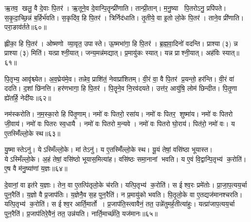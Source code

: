 ऋ॒तव॒ खलु॒ वै दे॒वाः पि॒तर॑।
ऋ॒तूने॒व दे॒वान्पि॒तॄन्प्री॑णाति।
तान्प्री॒तान्।
म॒नु॒ष्या पि॒तरोऽनु॒ प्रपि॑पते।
स॒कृ॒दा॒च्छि॒न्नं ब॒र्\mbox{}हिर्भ॑वति।
स॒कृदि॑व॒ हि पि॒तर॑।
त्रिर्निद॑धाति।
तृ॒तीये॒ वा इ॒तो लो॒के पि॒तर॑।
ताने॒व प्री॑णाति।
परा॒ङाव॑र्तते॥६०॥

ह्लीका॒ हि पि॒तर॑।
ओष्मणो व्या॒वृत॒ उपास्ते।
ऊ॒ष्मभा॑गा॒ हि पि॒तर॑।
ब्र॒ह्म॒वा॒दिनो॑ वदन्ति।
प्राश्या (३) न्न प्राश्या (३) मिति॑।
यत्प्राश्नी॒यात्।
जन्य॒मन्न॑मद्यात्।
प्र॒मायु॑कः स्यात्।
यन्न प्राश्नी॒यात्।
अह॑विः स्यात्॥६१॥

पि॒तृभ्य॒ आवृ॑श्च्येत।
अ॒व॒घ्रेय॑मे॒व।
तन्नेव॒ प्राशि॑तं॒ नेवाप्रा॑शितम्।
वी॒रं वा॒ वै पि॒तर॑ प्र॒यन्तो॒ हर॑न्ति।
वी॒रं वा॑ ददति।
द॒शां छि॑नत्ति।
हर॑णभागा॒ हि पि॒तर॑।
पि॒तॄने॒व नि॒रव॑दयते।
उत्त॑र॒ आयु॑षि॒ लोम॑ छिन्दीत।
पि॒तृ॒णा ह्ये॑तर्\mbox{}हि॒ नेदी॑यः॥६२॥

नम॑स्करोति।
न॒म॒स्का॒रो हि पि॑तृ॒णाम्।
नमो॑ वः पितरो॒ रसा॑य।
नमो॑ वः पितर॒ शुष्मा॑य।
नमो॑ वः पितरो जी॒वाय॑।
नमो॑ वः पितरः स्व॒धायै।
नमो॑ वः पितरो म॒न्यवे।
नमो॑ वः पितरो घो॒राय॑।
पित॑रो॒ नमो॑ वः।
य ए॒तस्मिँ॑ल्लो॒के स्थ॥६३॥

यु॒ष्मास्तेऽनु॑।
येऽस्मिँल्लो॒के।
मां तेऽनु॑।
य ए॒तस्मिँ॑ल्लो॒के स्थ।
यू॒यं तेषां॒ वसि॑ष्ठा भूयास्त।
येऽस्मिँल्लो॒के।
अ॒हं तेषां॒ वसि॑ष्ठो भूयास॒मित्या॑ह।
वसि॑ष्ठः समा॒नानां भवति।
य ए॒वं वि॒द्वान्पि॒तृभ्य॑ क॒रोति॑।
ए॒ष वै म॑नु॒ष्या॑णां य॒ज्ञः॥६४॥

दे॒वानां॒ वा इत॑रे य॒ज्ञाः।
तेन॒ वा ए॒तत्पि॑तृलो॒के च॑रति।
यत्पि॒तृभ्य॑ क॒रोति॑।
स ईश्व॒रः प्रमे॑तोः।
प्रा॒जा॒प॒त्यय॒र्चा पुन॒रैति॑।
य॒ज्ञो वै प्र॒जाप॑तिः।
य॒ज्ञेनै॒व स॒ह पुन॒रैति॑।
न प्र॒मायु॑को भवति।
पि॒तृ॒लो॒के वा ए॒तद्यज॑मानश्चरति।
यत्पि॒तृभ्य॑ क॒रोति॑।
स ईश्व॒र आर्ति॒मार्तो।
प्र॒जाप॑ति॒स्त्वावैनं॒ तत॒ उन्ने॑तुमर्\mbox{}ह॒तीत्या॑हुः।
यत्प्रा॑जाप॒त्यय॒र्चा पुन॒रैति॑।
प्र॒जाप॑तिरे॒वैनं॒ तत॒ उन्न॑यति।
नार्ति॒मार्च्छ॑ति॒ यज॑मानः॥६५॥\anuvakamend[इत्य॑श्नुते पद्यन्ते पद्यन्ते॒ षड्वा ऋ॒तवो॑ वर्त॒तेऽह॑विः स्या॒न्नेदी॑य॒ स्थ य॒ज्ञो यज॑मानश्चरति॒ यत्पि॒तृभ्य॑ क॒रोति॒ पञ्च॑ च]




\clearpage
{}
\setcounter{anuvakam}{0}

